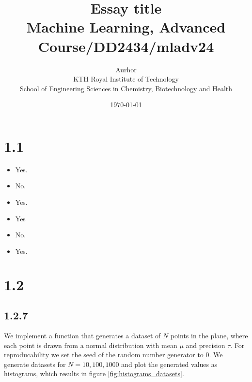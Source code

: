 \documentclass{article}
\title{Essay title\\\Large{Machine Learning, Advanced Course/DD2434/mladv24}}
\author{Aurhor \\ KTH Royal Institute of Technology\\ School of Engineering Sciences in Chemistry, Biotechnology and Health}
\date{\today}
\begin{document}
\maketitle
\thispagestyle{fancy}
\clearpage
\tableofcontents
\thispagestyle{fancy}

\clearpage
\fancyfoot[C]{\thepage}
\begin{multicols}{2}

    \section*{1.1}
    \begin{itemize}
        \item Yes.
        \item No.
        \item Yes.
        \item Yes
        \item No.
        \item Yes.
    \end{itemize}

    \section*{1.2}

    \subsection*{1.2.7}
    We implement a function that generates a dataset of $N$ points in the plane, where each point is drawn from a normal distribution with mean $\mu$ and precision $\tau$. For reproducability we set the seed of the random number generator to 0. We generate datasets for $N = 10, 100, 1000$ and plot the generated values as histograms, which results in figure \autoref{fig:histograms_datasets}. 


\end{multicols}
\end{document}
